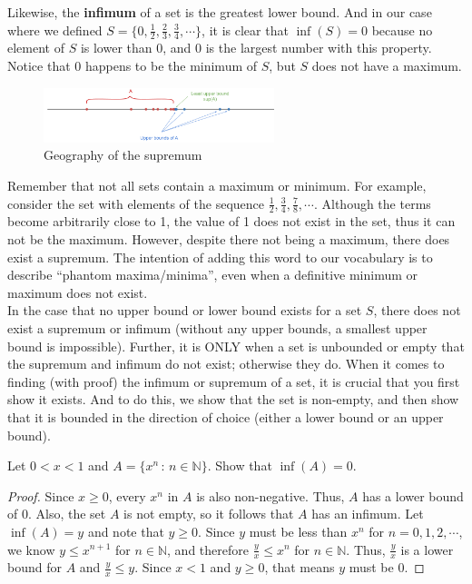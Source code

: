 Likewise, the \textbf{infimum} of a set is the greatest lower bound. And in our case where we defined $S=\{0,\frac{1}{2},\frac{2}{3},\frac{3}{4},\cdots\}$, it is clear that $\inf(S)=0$ because no element of $S$ is lower than $0$, and $0$ is the largest number with this property. Notice that $0$ happens to be the minimum of $S$, but $S$ does not have a maximum. \clearpage

\begin{figure}
  \begin{center}
    \includegraphics[width=0.6\textwidth]{Images/0sup.png}
  \end{center}
  \caption{Geography of the supremum}
\end{figure}

Remember that not all sets contain a maximum or minimum. For example, consider the set with elements of the sequence $\frac{1}{2},\frac{3}{4},\frac{7}{8},\cdots$. Although the terms become arbitrarily close to 1, the value of 1 does not exist in the set, thus it can not be the maximum. However, despite there not being a maximum, there does exist a supremum. The intention of adding this word to our vocabulary is to describe ``phantom maxima/minima'', even when a definitive minimum or maximum does not exist.\\

In the case that no upper bound or lower bound exists for a set $S$, there does not exist a supremum or infimum (without any upper bounds, a smallest upper bound is impossible). Further, it is ONLY when a set is unbounded or empty that the supremum and infimum do not exist; otherwise they do. When it comes to finding (with proof) the infimum or supremum of a set, it is crucial that you first show it exists. And to do this, we show that the set is non-empty, and then show that it is bounded in the direction of choice (either a lower bound or an upper bound). 

\begin{example}
    Let $0<x<1$ and $A=\{x^n\, :\, n\in\mathbb{N}\}$. Show that $\inf(A)=0$.\\

    \begin{proof}
        Since $x\geq 0$, every $x^n$ in $A$ is also non-negative. Thus, $A$ has a lower bound of 0. Also, the set $A$ is not empty, so it follows that $A$ has an infimum. Let $\inf(A)=y$ and note that $y\geq 0$. Since $y$ must be less than $x^n$ for $n=0,1,2,\cdots$, we know $y\leq x^{n+1}$ for $n\in\mathbb{N}$, and therefore $\frac{y}{x}\leq x^n$ for $n\in\mathbb{N}$. Thus, $\frac{y}{x}$ is a lower bound for $A$ and $\frac{y}{x}\leq y$. Since $x<1$ and $y\geq 0$, that means $y$ must be 0.
    \end{proof}
\end{example}

